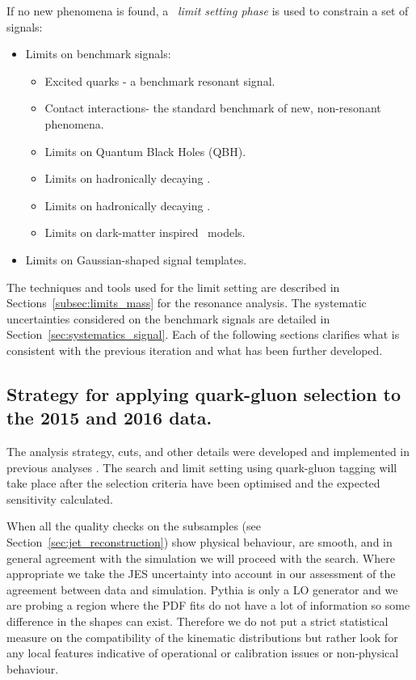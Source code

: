 If no new phenomena is found, a ~\textit{limit setting phase} is used
to constrain a set of signals: 
\begin{itemize}
 \item Limits on benchmark signals:
\begin{itemize}
 \item Excited quarks - a benchmark resonant signal.
 \item Contact interactions- the standard benchmark of new, non-resonant phenomena.
 \item Limits on Quantum Black Holes (QBH).
 \item Limits on hadronically decaying \Wprime .
 \item Limits on hadronically decaying \Wstar .
 \item Limits on dark-matter inspired \Zprime\ models.
\end{itemize}
 \item Limits on Gaussian-shaped signal templates.
\end{itemize}
The techniques and tools used for the limit setting are described in
Sections~\ref{subsec:limits_mass} for the resonance analysis. The
systematic uncertainties considered on the benchmark signals are
detailed in Section~\ref{sec:systematics_signal}.
Each of the following sections clarifies what is consistent
with the previous iteration and what has been further developed.


 \subsection{Strategy for applying quark-gluon selection to the 2015 and 2016 data.}
 \label{sec:201516data}

The analysis strategy, cuts, and other details were developed and implemented in previous analyses \cite{EXOT-2016-21,Bauce:2226443}.  
The search and limit setting using quark-gluon tagging will take place after the selection criteria 
have been optimised and the expected sensitivity calculated.

When all the quality checks on the subsamples (see Section~\ref{sec:jet_reconstruction})
show physical behaviour, are smooth, and in general agreement
with the simulation we will proceed with the search.
Where appropriate we take the
JES uncertainty into account in our assessment of the agreement
between data and simulation. 
Pythia is only a LO generator
and we are probing a region where the PDF fits do not
have a lot of information so some difference in the shapes
can exist. Therefore we do not put a strict statistical measure
on the compatibility of the kinematic distributions but rather
look for any local features indicative of operational or
calibration issues or non-physical behaviour.


